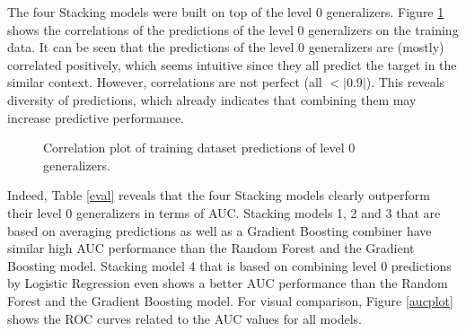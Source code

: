 \documentclass[12pt]{article}
\begin{document}
\noindent The four Stacking models were built on top of the level 0 generalizers. Figure \ref{corrgram} shows the correlations of the predictions of the level 0 generalizers on the training data. It can be seen that the predictions of the level 0 generalizers are (mostly) correlated positively, which seems intuitive since they all predict the target in the similar context. However, correlations are not perfect (all $<|0.9|$). This reveals diversity of predictions, which already indicates that combining them may increase predictive performance.

\begin{figure}[htp] 
\caption[Correlation of predictions]{Correlation plot of training dataset predictions of level 0 generalizers.}\label{corrgram}
\end{figure}  

Indeed, Table \ref{eval} reveals that the four Stacking models clearly outperform their level 0 generalizers in terms of AUC. Stacking models 1, 2 and 3 that are based on averaging predictions as well as a Gradient Boosting combiner have similar high AUC performance than the Random Forest and the Gradient Boosting model. Stacking model 4 that is based on combining level 0 predictions by Logistic Regression even shows a better AUC performance than the Random Forest and the Gradient Boosting model. For visual comparison, Figure \ref{aucplot} shows the ROC curves related to the AUC values for all models.
\end{document}
